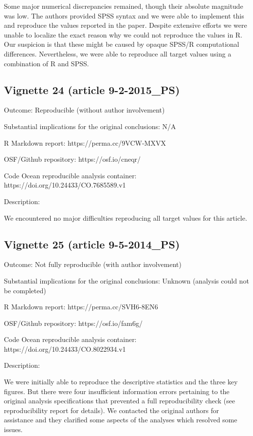 \documentclass[english,,man,floatsintext]{apa6}
\begin{document}
\begin{appendix}
Some major numerical discrepancies remained, though their absolute
magnitude was low. The authors provided SPSS syntax and we were able to
implement this and reproduce the values reported in the paper. Despite
extensive efforts we were unable to localize the exact reason why we
could not reproduce the values in R. Our suspicion is that these might
be caused by opaque SPSS/R computational differences. Nevertheless, we
were able to reproduce all target values using a combination of R and
SPSS.

\hypertarget{vignette-24-article-9-2-2015_ps}{%
\subsection{Vignette 24 (article
9-2-2015\_PS)}\label{vignette-24-article-9-2-2015_ps}}

Outcome: Reproducible (without author involvement)

Substantial implications for the original conclusions: N/A

R Markdown report: https://perma.cc/9VCW-MXVX

OSF/Github repository: https://osf.io/cneqr/

Code Ocean reproducible analysis container:
https://doi.org/10.24433/CO.7685589.v1

Description:

We encountered no major difficulties reproducing all target values for
this article.

\hypertarget{vignette-25-article-9-5-2014_ps}{%
\subsection{Vignette 25 (article
9-5-2014\_PS)}\label{vignette-25-article-9-5-2014_ps}}

Outcome: Not fully reproducible (with author involvement)

Substantial implications for the original conclusions: Unknown (analysis
could not be completed)

R Markdown report: https://perma.cc/SVH6-8EN6

OSF/Github repository: https://osf.io/fam6g/

Code Ocean reproducible analysis container:
https://doi.org/10.24433/CO.8022934.v1

Description:

We were initially able to reproduce the descriptive statistics and the
three key figures. But there were four insufficient information errors
pertaining to the original analysis specifications that prevented a full
reproducibility check (see reproducibility report for details). We
contacted the original authors for assistance and they clarified some
aspects of the analyses which resolved some issues.


\end{appendix}
\end{document}
